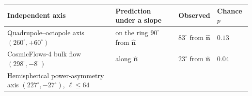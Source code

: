 \documentclass[
  11pt,
]{article}
\begin{document}
\begin{longtable}[]{@{}llll@{}}
\toprule
\begin{minipage}[b]{0.22\columnwidth}\raggedright
Independent axis\strut
\end{minipage} & \begin{minipage}[b]{0.22\columnwidth}\raggedright
Prediction under a slope\strut
\end{minipage} & \begin{minipage}[b]{0.22\columnwidth}\raggedright
Observed\strut
\end{minipage} & \begin{minipage}[b]{0.22\columnwidth}\raggedright
Chance \(p\)\strut
\end{minipage}\tabularnewline
\midrule
\endhead
\begin{minipage}[t]{0.22\columnwidth}\raggedright
Quadrupole--octopole axis \((260^\circ, +60^\circ)\)\strut
\end{minipage} & \begin{minipage}[t]{0.22\columnwidth}\raggedright
on the ring \(90^\circ\) from \(\hat{\mathbf n}\)\strut
\end{minipage} & \begin{minipage}[t]{0.22\columnwidth}\raggedright
\(83^\circ\) from \(\hat{\mathbf n}\)\strut
\end{minipage} & \begin{minipage}[t]{0.22\columnwidth}\raggedright
\(0.13\)\strut
\end{minipage}\tabularnewline
\begin{minipage}[t]{0.22\columnwidth}\raggedright
CosmicFlows-4 bulk flow \((298^\circ, -8^\circ)\)\strut
\end{minipage} & \begin{minipage}[t]{0.22\columnwidth}\raggedright
along \(\hat{\mathbf n}\)\strut
\end{minipage} & \begin{minipage}[t]{0.22\columnwidth}\raggedright
\(23^\circ\) from \(\hat{\mathbf n}\)\strut
\end{minipage} & \begin{minipage}[t]{0.22\columnwidth}\raggedright
\(0.04\)\strut
\end{minipage}\tabularnewline
\begin{minipage}[t]{0.22\columnwidth}\raggedright
Hemispherical power-asymmetry axis \((227^\circ, -27^\circ)\),
\(\ell \le 64\)\strut
\end{minipage} & \begin{minipage}[t]{0.22\columnwidth}\raggedright

\end{minipage}
\end{longtable}
\end{document}
